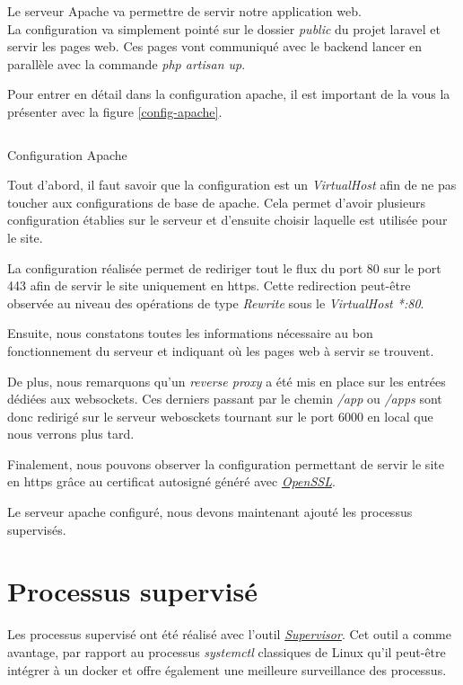 \documentclass[
    iai, %
    il, %
]{heig-tb}
\begin{document}
Le serveur Apache va permettre de servir notre application web. \\
La configuration va simplement pointé sur le dossier \emph{public} du projet \Gls{laravel} et servir les pages web. Ces pages vont communiqué avec le \Gls{backend} lancer en parallèle avec la commande \emph{php artisan up}.

Pour entrer en détail dans la configuration \Gls{apache}, il est important de la vous la présenter avec la figure \ref{config-apache}.

\begin{listing}[h]
    \inputminted{conf}{assets/code/config-apache.conf}
    \caption{Configuration Apache \label{config-apache}}
\end{listing}

Tout d'abord, il faut savoir que la configuration est un \emph{VirtualHost} afin de ne pas toucher aux configurations de base de \Gls{apache}. Cela permet d'avoir plusieurs configuration établies sur le serveur et d'ensuite choisir laquelle est utilisée pour le site.

La configuration réalisée permet de rediriger tout le flux du port 80 sur le port 443 afin de servir le site uniquement en \Gls{https}. Cette redirection peut-être observée au niveau des opérations de type \emph{Rewrite} sous le \emph{VirtualHost *:80}.

Ensuite, nous constatons toutes les informations nécessaire au bon fonctionnement du serveur et indiquant où les pages web à servir se trouvent.

De plus, nous remarquons qu'un \emph{reverse proxy} a été mis en place sur les entrées dédiées aux \Gls{websockets}. Ces derniers passant par le chemin \emph{/app} ou \emph{/apps} sont donc redirigé sur le serveur webosckets tournant sur le port 6000 en local que nous verrons plus tard.

Finalement, nous pouvons observer la configuration permettant de servir le site en  \Gls{https} grâce au certificat autosigné généré avec \href{https://www.openssl.org/}{\emph{OpenSSL}}.

Le serveur \Gls{apache} configuré, nous devons maintenant ajouté les processus supervisés.

\section{Processus supervisé}
Les processus supervisé ont été réalisé avec l'outil \href{http://supervisord.org/}{\emph{Supervisor}}. Cet outil a comme avantage, par rapport au processus \emph{systemctl} classiques de Linux qu'il peut-être intégrer à un \Gls{docker} et offre également une meilleure surveillance des processus.
\end{document}
